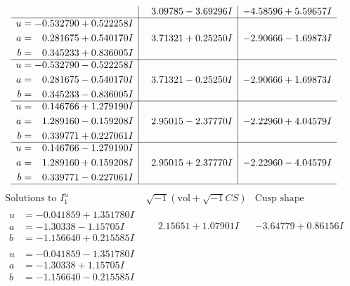 \documentclass[1p]{elsarticle_modified}
\theoremstyle{definition}
\newcommand{\I}{\sqrt{-1}}
\begin{document}
$$\begin{array}{c|c|c}
 & \phantom{-}3.09785 - 3.69296 I & -4.58596 + 5.59657 I \\ \hline\begin{aligned}
u &= -0.532790 + 0.522258 I \\
a &= \phantom{-}0.281675 + 0.540170 I \\
b &= \phantom{-}0.345233 + 0.836005 I\end{aligned}
 & \phantom{-}3.71321 + 0.25250 I & -2.90666 - 1.69873 I \\ \hline\begin{aligned}
u &= -0.532790 - 0.522258 I \\
a &= \phantom{-}0.281675 - 0.540170 I \\
b &= \phantom{-}0.345233 - 0.836005 I\end{aligned}
 & \phantom{-}3.71321 - 0.25250 I & -2.90666 + 1.69873 I \\ \hline\begin{aligned}
u &= \phantom{-}0.146766 + 1.279190 I \\
a &= \phantom{-}1.289160 - 0.159208 I \\
b &= \phantom{-}0.339771 + 0.227061 I\end{aligned}
 & \phantom{-}2.95015 - 2.37770 I & -2.22960 + 4.04579 I \\ \hline\begin{aligned}
u &= \phantom{-}0.146766 - 1.279190 I \\
a &= \phantom{-}1.289160 + 0.159208 I \\
b &= \phantom{-}0.339771 - 0.227061 I\end{aligned}
 & \phantom{-}2.95015 + 2.37770 I & -2.22960 - 4.04579 I\\
 \hline 
 \end{array}$$\newpage$$\begin{array}{c|c|c}  
\text{Solutions to }I^u_{1}& \I (\text{vol} + \sqrt{-1}CS) & \text{Cusp shape}\\
 \hline 
\begin{aligned}
u &= -0.041859 + 1.351780 I \\
a &= -1.30338 - 1.15705 I \\
b &= -1.156640 + 0.215585 I\end{aligned}
 & \phantom{-}2.15651 + 1.07901 I & -3.64779 + 0.86156 I \\ \hline\begin{aligned}
u &= -0.041859 - 1.351780 I \\
a &= -1.30338 + 1.15705 I \\
b &= -1.156640 - 0.215585 I\end{aligned}

\end{array}$$
\end{document}
